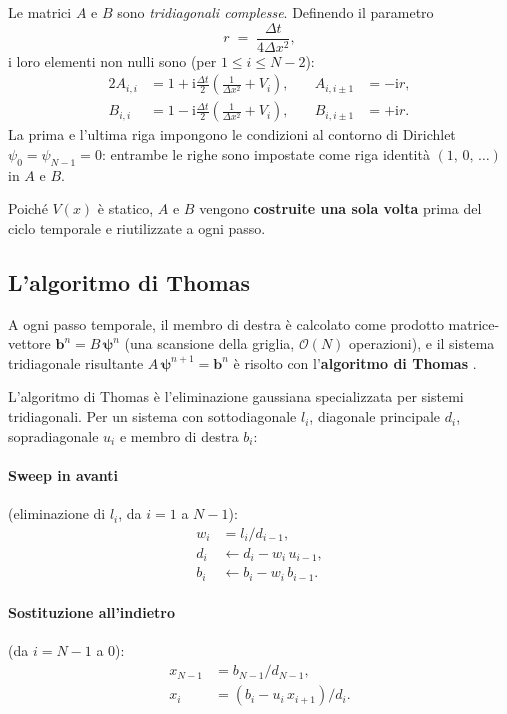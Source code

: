 \documentclass[12pt, a4paper]{article}
\newcommand{\dt}{\Delta t}
\newcommand{\dx}{\Delta x}
\newcommand{\ii}{\mathrm{i}}          %
\begin{document}
Le matrici $A$ e $B$ sono \emph{tridiagonali complesse}.  Definendo
il parametro
\begin{equation}
  r \;=\; \frac{\dt}{4\dx^2},
\end{equation}
i loro elementi non nulli sono (per $1 \leq i \leq N-2$):
\begin{alignat}{2}
  A_{i,i}   &= 1 + \ii\frac{\dt}{2}\!\left(\frac{1}{\dx^2} + V_i\right),
  &\quad A_{i,i\pm 1} &= -\ii r, \label{eq:A_elements}\\[4pt]
  B_{i,i}   &= 1 - \ii\frac{\dt}{2}\!\left(\frac{1}{\dx^2} + V_i\right),
  &\quad B_{i,i\pm 1} &= +\ii r. \label{eq:B_elements}
\end{alignat}
La prima e l'ultima riga impongono le condizioni al contorno di
Dirichlet $\psi_0 = \psi_{N-1} = 0$: entrambe le righe sono impostate
come riga identità $(1,\,0,\,\ldots)$ in $A$ e $B$.

Poiché $V(x)$ è statico, $A$ e $B$ vengono \textbf{costruite una sola
volta} prima del ciclo temporale e riutilizzate a ogni passo.

\subsection{L'algoritmo di Thomas}
\label{sec:thomas}

A ogni passo temporale, il membro di destra è calcolato come prodotto
matrice-vettore $\mathbf{b}^n = B\,\boldsymbol{\psi}^n$ (una
scansione della griglia, $\mathcal{O}(N)$ operazioni), e il sistema
tridiagonale risultante $A\,\boldsymbol{\psi}^{n+1} = \mathbf{b}^n$
è risolto con l'\textbf{algoritmo di Thomas} \cite{Thomas1949}.

L'algoritmo di Thomas è l'eliminazione gaussiana specializzata per
sistemi tridiagonali.  Per un sistema con sottodiagonale $l_i$,
diagonale principale $d_i$, sopradiagonale $u_i$ e membro di destra
$b_i$:

\paragraph{Sweep in avanti} (eliminazione di $l_i$, da $i=1$ a $N-1$):
\begin{align}
  w_i &= l_i / d_{i-1}, \\
  d_i &\leftarrow d_i - w_i\,u_{i-1}, \\
  b_i &\leftarrow b_i - w_i\,b_{i-1}.
\end{align}

\paragraph{Sostituzione all'indietro} (da $i=N-1$ a $0$):
\begin{align}
  x_{N-1} &= b_{N-1}/d_{N-1}, \\
  x_i     &= (b_i - u_i\,x_{i+1}) / d_i.
\end{align}
\end{document}
